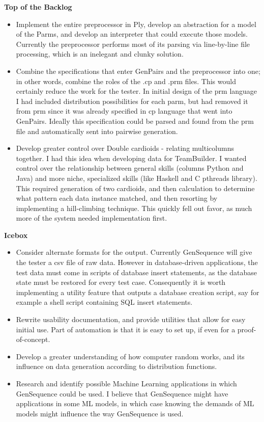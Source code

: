 \textbf{Top of the Backlog}
\begin{itemize}
\item Implement the entire preprocessor in Ply, develop an abstraction for a model of the Parms, and develop an interpreter that could execute those models. Currently the preprocessor performs most of its parsing via line-by-line file processing, which is an inelegant and clunky solution.
\item Combine the specifications that enter GenPairs and the preprocessor into one; in other words, combine the roles of the .cp and .prm files. This would certainly reduce the work for the tester. In initial design of the prm language I had included distribution possibilities for each parm, but had removed it from prm since it was already specified in cp language that went into GenPairs. Ideally this specification could be parsed and found from the prm file and automatically sent into pairwise generation.
\item Develop greater control over Double cardioids - relating multicolumns together. I had this idea when developing data for TeamBuilder. I wanted control over the relationship between general skills (columns Python and Java) and more niche, specialized skills (like Haskell and C pthreads library). This required generation of two cardioids, and then calculation to determine what pattern each data instance matched, and then resorting by implementing a hill-climbing technique. This quickly fell out favor, as much more of the system needed implementation first.
\end{itemize}

\textbf{Icebox}
\begin{itemize}
\item Consider alternate formats for the output. Currently GenSequence will give the tester a csv file of raw data. However in database-driven applications, the test data must come in scripts of database insert statements, as the database state must be restored for every test case. Consequently it is worth implementing a utility feature that outputs a database creation script, say for example a shell script containing SQL insert statements.
\item Rewrite usability documentation, and provide utilities that allow for easy initial use. Part of automation is that it is easy to set up, if even for a proof-of-concept.
\item Develop a greater understanding of how computer random works, and its influence on data generation according to distribution functions.
\item Research and identify possible Machine Learning applications in which GenSequence could be used. I believe that GenSequence might have applications in some ML models, in which case knowing the demands of ML models might influence the way GenSequence is used.
\end{itemize}

